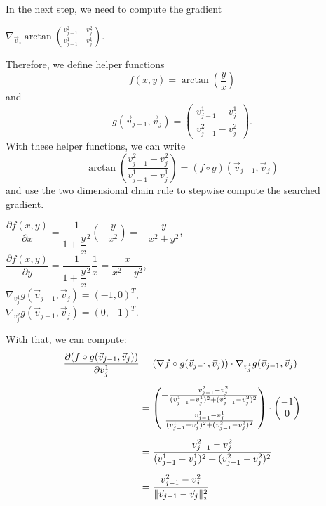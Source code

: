\begin{proposition}
	In the next step, we need to compute the gradient 
	\begin{center}
		$
		\nabla_{\vec{v}_j} \arctan(\frac{v_{j-1}^2 - v_{j}^2}{v_{j-1}^1 - v_{j}^1}).
		$
	\end{center}
	
	Therefore, we define helper functions 
	$$ f(x,y) = \arctan( \frac{y}{x})$$ 
	and 
	$$g(\vec{v}_{j-1}, \vec{v}_{j}) = \begin{pmatrix}
		v_{j-1}^1 - v_{j}^1 \\[0.5em] 
		v_{j-1}^2 - v_{j}^2
	\end{pmatrix}.$$
	With these helper functions, we can write 
	$$ \arctan\left(\frac{v_{j-1}^2 - v_{j}^2}{v_{j-1}^1 - v_{j}^1}\right) = (f \circ g) (\vec{v}_{j-1}, \vec{v}_{j}) $$
	and use the two dimensional chain rule to stepwise compute the searched gradient. 
 
	\begin{center}
		
		$\dfrac{\partial f(x,y)}{\partial x} = \dfrac{1}{1 + \dfrac{y}{x}^2} (- \dfrac{y}{x^2}) = - \dfrac{y}{x^2 + y^2}$, \\
		$\dfrac{\partial f(x,y)}{\partial y} = \dfrac{1}{1 + \dfrac{y}{x}^2}  \dfrac{1}{x} =  \dfrac{x}{x^2 + y^2}$, \\ [0.5em]

		$ \nabla_{v_j^1} g(\vec{v}_{j-1}, \vec{v}_{j}) = (-1, 0)^T$, \\
		$ \nabla_{v_j^2} g(\vec{v}_{j-1}, \vec{v}_{j}) = (0, -1)^T$. 
	
	\end{center}

	With that, we can compute:
	\begin{align*}
		\frac{\partial (f \circ g (\vec{v}_{j-1}, \vec{v}_j))}{\partial v_j^1} &= (\nabla f \circ g (\vec{v}_{j-1}, \vec{v}_j)) \cdot \nabla_{v_j^1} g (\vec{v}_{j-1}, \vec{v}_j) \\[0.5em]
		&= \begin{pmatrix}
			- \frac{v_{j-1}^2 - v_{j}^2}{(v_{j-1}^1 - v_{j}^1)^2 + (v_{j-1}^2 - v_{j}^2)^2} \\[1.0em]
			\frac{v_{j-1}^1 - v_{j}^1}{(v_{j-1}^1 - v_{j}^1)^2 + (v_{j-1}^2 - v_{j}^2)^2}
		\end{pmatrix}
		\cdot 
		\begin{pmatrix}
			-1 \\
			0
		\end{pmatrix} \\[0.5em]
		&= \frac{v_{j-1}^2 - v_{j}^2}{(v_{j-1}^1 - v_{j}^1)^2 + (v_{j-1}^2 - v_{j}^2)^2} \\[0.5em]
		&= \frac{v_{j-1}^2 - v_{j}^2}{\norm[\vec{v}_{j-1} - \vec{v}_j]^2}
	\end{align*}


\end{proposition}

